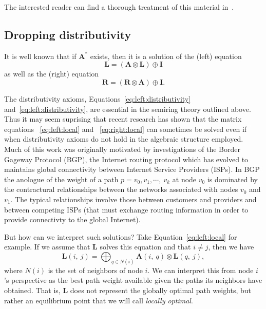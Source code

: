 The interested reader can find a thorough treatment of 
this material in~\cite{gondran_graphs_2008}.   

\subsection{Dropping distributivity} 
\label{subsect.dropping.distributivity}

It is well known that if $\mathbf{A}^*$ exists, then it 
is a solution of the (left) equation 
\begin{equation}
\label{eq:left:local}
\mathbf{L} = (\mathbf{A}\otimes \mathbf{L}) \oplus \mathbf{I}
\end{equation}
as well as the (right) equation 
\begin{equation}
\label{eq:right:local}
\mathbf{R} = (\mathbf{R}\otimes \mathbf{A}) \oplus \mathbf{I}. 
\end{equation}

The distributivity axioms, 
Equations~\ref{eq:left:distributivity} and~\ref{eq:left:distributivity}, 
are essential in the semiring theory outlined above. 
Thus it may seem suprising that recent research has shown that
the matrix equations ~\ref{eq:left:local} and ~\ref{eq:right:local} 
can sometimes be solved even if when 
distributivity axioms do not hold in the algebraic structure employed. 
Much of this work was originally motivated 
by investigations of the Border Gageway Protocol (BGP), 
the Internet routing protocol which has evolved to 
maintains global connectivity between Internet Service Providers (ISPs). 
In BGP the anologue of the weight of a path 
$p = v_0, v_1, \cdots,\ v_k$ at node $v_0$ 
is dominated by the contractural relationships between 
the networks associated with nodes $v_0$ and $v_1$.
The typical relationships involve those between customers 
and providers and between competing ISPs (that must exchange
routing information in order to provide connectivty to 
the global Internet).  

But how can we interpret such solutions? 
Take Equation~\ref{eq:left:local} for example. 
If we assume that $\mathbf{L}$ solves this equation 
and that $i \neq j$, then we have 
\begin{equation}
\label{eq:left:local:at:i}
\mathbf{L}(i,\ j) = \displaystyle\bigoplus_{q \in N(i)} \mathbf{A}(i,\ q) \otimes \mathbf{L}(q,\ j), 
\end{equation}
where $N(i)$ is the set of neighbors of node $i$. 
We can interpret this from node $i$'s perspective as 
the best path weight available given the paths its neighbors 
have obtained. 
That is, $\mathbf{L}$ does not represent the globally optimal 
path weights, but rather an equilibrium point that we will 
call \emph{locally optimal}. 



